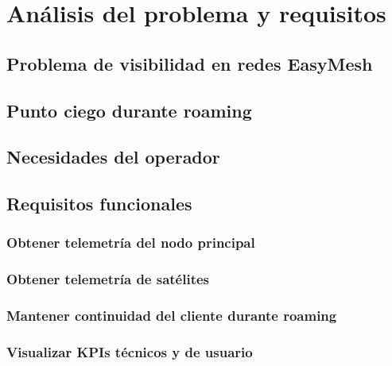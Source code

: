 %
%

\chapter{Análisis del problema y requisitos}
\label{cha:analisis-problema-requisitos}

\section{Problema de visibilidad en redes EasyMesh}
\label{sec:problema-visibilidad-redes-easymesh}

\section{Punto ciego durante roaming}
\label{sec:punto-ciego-durante-roaming}

\section{Necesidades del operador}
\label{sec:necesidades-operador}

\section{Requisitos funcionales}
\label{sec:requisitos-funcionales}

\subsection{Obtener telemetría del nodo principal}
\label{subsec:obtener-telemetria-nodo-principal}

\subsection{Obtener telemetría de satélites}
\label{subsec:obtener-telemetria-satelites}

\subsection{Mantener continuidad del cliente durante roaming}
\label{subsec:mantener-continuidad-cliente-roaming}

\subsection{Visualizar KPIs técnicos y de usuario}
\label{subsec:visualizar-kpis-tecnicos-usuario}

